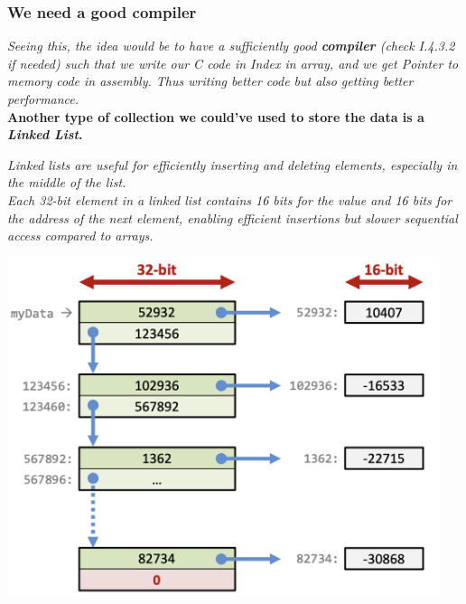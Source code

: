 \subsubsection{We need a good compiler}
\textit{Seeing this, the idea would be to have a sufficiently good \textbf{compiler} (check I.4.3.2 if needed) such that we write our C code in Index in array, and we get Pointer to memory code in assembly. Thus writing better code but also getting better performance.} \\
\textbf{Another type of collection we could've used to store the data is a \textit{Linked List}.} \\
\vspace*{5px}
\begin{minipage}[htp]{0.45\textwidth}   
    \textit{Linked lists are useful for efficiently inserting and deleting elements, especially in the middle of the list.} \\
    \vspace*{5px}
    \textit{Each 32-bit element in a linked list contains 16 bits for the value and 16 bits for the address of the next element, enabling efficient insertions but slower sequential access compared to arrays.}
\end{minipage}
\hfill
\vline
\hfill
\begin{minipage}[htp]{0.45\textwidth}
\begin{center}
    \includegraphics[width=0.95\textwidth]{chapters/chapter1d/images/linked_list.png}
\end{center}
\end{minipage}
